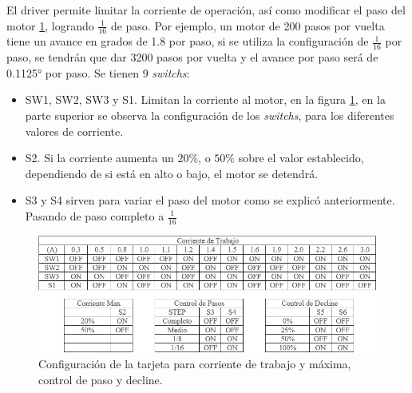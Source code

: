 El driver permite limitar la corriente de operación, así como modificar el paso del motor \ref{fig:tmap0051}, logrando  $\frac{1}{16}$ de paso. Por ejemplo, un motor de 200 pasos por vuelta tiene un avance en grados de 1.8 por paso, si se utiliza la configuración de $\frac{1}{16}$ por paso, se tendrán que dar 3200 pasos por vuelta y el avance por paso será de 0.1125° por paso. Se tienen 9 \textit{switchs}:
\begin{itemize}
	\item SW1, SW2, SW3 y S1. Limitan la corriente al motor, en la figura \ref{fig:tmap0051}, en la parte superior se observa la configuración de los \textit{switchs}, para los diferentes valores de corriente.
	\item  S2. Si la corriente aumenta un $20\%$, o $50\%$ sobre el valor establecido, dependiendo de si está en alto o bajo, el motor se detendrá.
	\item  S3 y S4 sirven para variar el paso del motor como se explicó anteriormente. Pasando de paso completo a $\frac{1}{16}$
\end{itemize} 
\begin{figure}[h]
	\centering
	\includegraphics[width=1\linewidth]{Imagenes/2/tmap_0051}
	\caption[Configuración de la tarjeta TB6560]{Configuración de la tarjeta para corriente de trabajo y máxima, control de paso y decline. \cite{TB6560}}
	\label{fig:tmap0051}
\end{figure}

